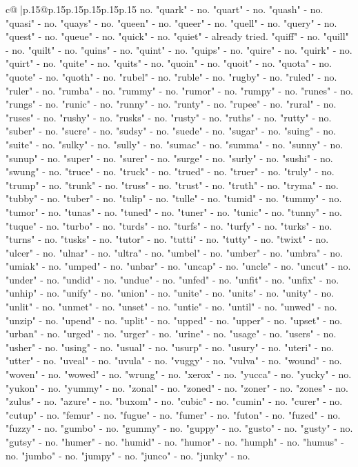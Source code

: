 \documentclass{article}
\begin{document}
{\begin{supertabular}{c@{$\;$}|p{.15\linewidth}@{}p{.15\linewidth}p{.15\linewidth}p{.15\linewidth}p{.15\linewidth}p{.15\linewidth}}
{{{no. "quark" {-} no. "quart" {-} no. "quash" {-} no. "quasi" {-} no. "quays" {-} no. "queen" {-} no. "queer" {-} no. "quell" {-} no. "query" {-} no. "quest" {-} no. "queue" {-} no. "quick" {-} no. "quiet" {-} already tried. "quiff" {-} no. "quill" {-} no. "quilt" {-} no. "quins" {-} no. "quint" {-} no. "quips" {-} no. "quire" {-} no. "quirk" {-} no. "quirt" {-} no. "quite" {-} no. "quits" {-} no. "quoin" {-} no. "quoit" {-} no. "quota" {-} no. "quote" {-} no. "quoth" {-} no. "rubel" {-} no. "ruble" {-} no. "rugby" {-} no. "ruled" {-} no. "ruler" {-} no. "rumba" {-} no. "rummy" {-} no. "rumor" {-} no. "rumpy" {-} no. "runes" {-} no. "rungs" {-} no. "runic" {-} no. "runny" {-} no. "runty" {-} no. "rupee" {-} no. "rural" {-} no. "ruses" {-} no. "rushy" {-} no. "rusks" {-} no. "rusty" {-} no. "ruths" {-} no. "rutty" {-} no. "suber" {-} no. "sucre" {-} no. "sudsy" {-} no. "suede" {-} no. "sugar" {-} no. "suing" {-} no. "suite" {-} no. "sulky" {-} no. "sully" {-} no. "sumac" {-} no. "summa" {-} no. "sunny" {-} no. "sunup" {-} no. "super" {-} no. "surer" {-} no. "surge" {-} no. "surly" {-} no. "sushi" {-} no. "swung" {-} no. "truce" {-} no. "truck" {-} no. "trued" {-} no. "truer" {-} no. "truly" {-} no. "trump" {-} no. "trunk" {-} no. "truss" {-} no. "trust" {-} no. "truth" {-} no. "tryma" {-} no. "tubby" {-} no. "tuber" {-} no. "tulip" {-} no. "tulle" {-} no. "tumid" {-} no. "tummy" {-} no. "tumor" {-} no. "tunas" {-} no. "tuned" {-} no. "tuner" {-} no. "tunic" {-} no. "tunny" {-} no. "tuque" {-} no. "turbo" {-} no. "turds" {-} no. "turfs" {-} no. "turfy" {-} no. "turks" {-} no. "turns" {-} no. "tusks" {-} no. "tutor" {-} no. "tutti" {-} no. "tutty" {-} no. "twixt" {-} no. "ulcer" {-} no. "ulnar" {-} no. "ultra" {-} no. "umbel" {-} no. "umber" {-} no. "umbra" {-} no. "umiak" {-} no. "umped" {-} no. "unbar" {-} no. "uncap" {-} no. "uncle" {-} no. "uncut" {-} no. "under" {-} no. "undid" {-} no. "undue" {-} no. "unfed" {-} no. "unfit" {-} no. "unfix" {-} no. "unhip" {-} no. "unify" {-} no. "union" {-} no. "unite" {-} no. "units" {-} no. "unity" {-} no. "unlit" {-} no. "unmet" {-} no. "unset" {-} no. "untie" {-} no. "until" {-} no. "unwed" {-} no. "unzip" {-} no. "upend" {-} no. "uplit" {-} no. "upped" {-} no. "upper" {-} no. "upset" {-} no. "urban" {-} no. "urged" {-} no. "urger" {-} no. "urine" {-} no. "usage" {-} no. "users" {-} no. "usher" {-} no. "using" {-} no. "usual" {-} no. "usurp" {-} no. "usury" {-} no. "uteri" {-} no. "utter" {-} no. "uveal" {-} no. "uvula" {-} no. "vuggy" {-} no. "vulva" {-} no. "wound" {-} no. "woven" {-} no. "wowed" {-} no. "wrung" {-} no. "xerox" {-} no. "yucca" {-} no. "yucky" {-} no. "yukon" {-} no. "yummy" {-} no. "zonal" {-} no. "zoned" {-} no. "zoner" {-} no. "zones" {-} no. "zulus" {-} no. "azure" {-} no. "buxom" {-} no. "cubic" {-} no. "cumin" {-} no. "curer" {-} no. "cutup" {-} no. "femur" {-} no. "fugue" {-} no. "fumer" {-} no. "futon" {-} no. "fuzed" {-} no. "fuzzy" {-} no. "gumbo" {-} no. "gummy" {-} no. "guppy" {-} no. "gusto" {-} no. "gusty" {-} no. "gutsy" {-} no. "humer" {-} no. "humid" {-} no. "humor" {-} no. "humph" {-} no. "humus" {-} no. "jumbo" {-} no. "jumpy" {-} no. "junco" {-} no. "junky" {-} no. }}}
\end{supertabular}}
\end{document}
